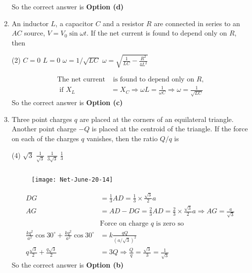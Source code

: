 \begin{enumerate}
\begin{answer}
	So the correct answer is \textbf{Option (d)}
\end{answer}
\item An inductor $L$, a capacitor $C$ and a resistor $R$ are connected in series to an $A C$ source, $V=V_{0} \sin \omega t$. If the net current is found to depend only on $R$, then
 \begin{tasks}(2)
	\task[\textbf{a.}]$C=0$
	\task[\textbf{b.}]$L=0$
	\task[\textbf{c.}]$\omega=1 / \sqrt{L C}$
	\task[\textbf{d.}]$\omega=\sqrt{\frac{1}{L C}-\frac{R^{2}}{4 L^{2}}}$ 
\end{tasks}
\begin{answer}
	\begin{align*}
	\text{The net current}&\text{ is found to depend only on $R$,}\\
	\text { if } X_{L}&=X_{C} \Rightarrow \omega L=\frac{1}{\omega C} \Rightarrow \omega=\frac{1}{\sqrt{L C}}
	\end{align*}
		So the correct answer is \textbf{Option (c)}
\end{answer}
\item Three point charges $q$ are placed at the corners of an equilateral triangle. Another point charge $-Q$ is placed at the centroid of the triangle. If the force on each of the charges $q$ vanishes, then the ratio $Q / q$ is
 \begin{tasks}(4)
	\task[\textbf{a.}]$\sqrt{3}$
	\task[\textbf{b.}]$\frac{1}{\sqrt{3}}$
	\task[\textbf{c.}]$\frac{1}{3 \sqrt{3}}$
	\task[\textbf{d.}]$\frac{1}{3}$ 
\end{tasks}
\begin{answer}$\left. \right. $
		\begin{figure}[H]
		\centering
		\texttt{[image: Net-June-20-14]}
	\end{figure}
	\begin{align*}
 D G&=\frac{1}{3} A D=\frac{1}{3} \times \frac{\sqrt{3}}{2} a\\
	A G&=A D-D G=\frac{2}{3} A D=\frac{2}{3} \times \frac{\sqrt{3}}{2} a \Rightarrow A G=\frac{a}{\sqrt{3}}\\
	&\text{Force on charge $q$ is zero so}\\
	\frac{k q^{2}}{a^{2}} \cos 30^{\circ}+\frac{k q^{2}}{a^{2}} \cos 30^{\circ}&=k \frac{q Q}{(a / \sqrt{3})^{2}} \\
	q \frac{\sqrt{3}}{2}+\frac{q \sqrt{3}}{2}&=3 Q \Rightarrow \frac{Q}{q}=\frac{\sqrt{3}}{3}=\frac{1}{\sqrt{3}}
	\end{align*}
		So the correct answer is \textbf{Option (b)}

\end{answer}
\end{enumerate}
